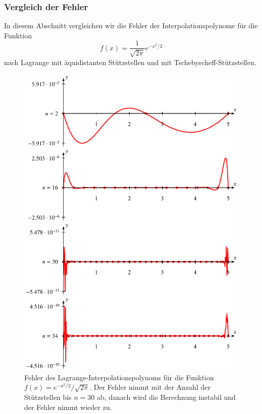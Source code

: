 %
%
%
\subsubsection{Vergleich der Fehler}
In diesem Abschnitt vergleichen wir die Fehler der Interpolationspolynome
für die Funktion
\[
f(x)
=
\frac{1}{\sqrt{2\pi}} e^{-x^2/2}
\]
nach Lagrange mit äquidistanten Stützstellen und mit
Tschebyscheff-Stützstellen.

\begin{figure}
\centering
\includegraphics{chapters/30-interpolation/figures/norm.pdf}
\caption{Fehler des Lagrange-Interpolationspolynoms für die Funktion
$f(x)=e^{-x^2/2}/\sqrt{2\pi}$.
Der Fehler nimmt mit der Anzahl der Stützstellen bis $n=30$ ab, danach
wird die Berechnung instabil und der Fehler nimmt wieder zu.
\label{buch:figure:lagrangefehler}}
\end{figure}



